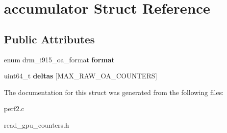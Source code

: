 \hypertarget{structaccumulator}{}\section{accumulator Struct Reference}
\label{structaccumulator}
\subsection*{Public Attributes}
\begin{DoxyCompactItemize}
\item 
\mbox{\label{structaccumulator_a24484cae6ce32124dbe69a2a6db6cac7}} 
enum drm\+\_\+i915\+\_\+oa\+\_\+format {\bfseries format}
\item 
\mbox{\label{structaccumulator_acbcdeba3df436e53243faa0f09754c7e}} 
uint64\+\_\+t {\bfseries deltas} \mbox{[}M\+A\+X\+\_\+\+R\+A\+W\+\_\+\+O\+A\+\_\+\+C\+O\+U\+N\+T\+E\+RS\mbox{]}
\end{DoxyCompactItemize}


The documentation for this struct was generated from the following files\+:\begin{DoxyCompactItemize}
\item 
perf2.\+c\item 
read\+\_\+gpu\+\_\+counters.\+h\end{DoxyCompactItemize}
